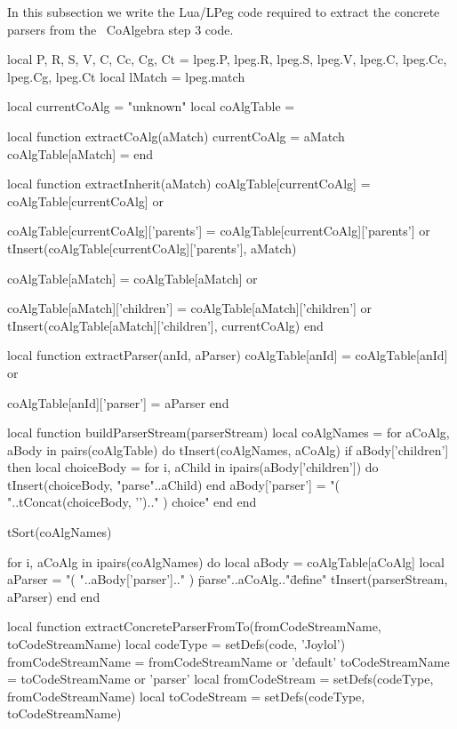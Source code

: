 In this subsection we write the Lua/LPeg code required to extract the 
concrete parsers from the \joylol\ CoAlgebra step 3 code.

\startMkIVCode
\def\extractConcreteParserFromTo#1#2{
  \directlua{
    thirddata.literateProgs.extractConcreteParserFromTo('#1', '#2')
  }
}
\stopMkIVCode

\startLuaCode
local P, R, S, V, C, Cc, Cg, Ct = 
  lpeg.P, lpeg.R, lpeg.S, lpeg.V, lpeg.C, lpeg.Cc, lpeg.Cg, lpeg.Ct
local lMatch = lpeg.match

local currentCoAlg = "unknown"
local coAlgTable   = {}

local function extractCoAlg(aMatch)
  currentCoAlg       = aMatch
  coAlgTable[aMatch] = {}
end

local function extractInherit(aMatch)
  coAlgTable[currentCoAlg] = coAlgTable[currentCoAlg] or {}
  
  coAlgTable[currentCoAlg]['parents'] = 
    coAlgTable[currentCoAlg]['parents'] or {}
  tInsert(coAlgTable[currentCoAlg]['parents'], aMatch)  
  
  coAlgTable[aMatch] = coAlgTable[aMatch] or { }
  
  coAlgTable[aMatch]['children'] = 
    coAlgTable[aMatch]['children'] or {}
  tInsert(coAlgTable[aMatch]['children'], currentCoAlg)
end

local function extractParser(anId, aParser)
  coAlgTable[anId] = coAlgTable[anId] or {}
  
  coAlgTable[anId]['parser'] = aParser
end

local function buildParserStream(parserStream)
  local coAlgNames = { }
  for aCoAlg, aBody in pairs(coAlgTable) do
    tInsert(coAlgNames, aCoAlg)
    if aBody['children'] then
      local choiceBody = {}
      for i, aChild in ipairs(aBody['children']) do
        tInsert(choiceBody, "parse"..aChild)
      end
      aBody['parser'] = "( "..tConcat(choiceBody, '\n').." ) choice"
    end
  end
  
  tSort(coAlgNames)
  
  for i, aCoAlg in ipairs(coAlgNames) do
    local aBody   = coAlgTable[aCoAlg]
    local aParser = "( "..aBody['parser'].." ) \"parse"..aCoAlg.."\" define"
    tInsert(parserStream, aParser)
  end
end

local function extractConcreteParserFromTo(fromCodeStreamName, toCodeStreamName)
  local codeType       = setDefs(code, 'Joylol')
  fromCodeStreamName   = fromCodeStreamName or 'default'
  toCodeStreamName     = toCodeStreamName   or 'parser'
  local fromCodeStream = setDefs(codeType, fromCodeStreamName)
  local toCodeStream   = setDefs(codeType, toCodeStreamName)

